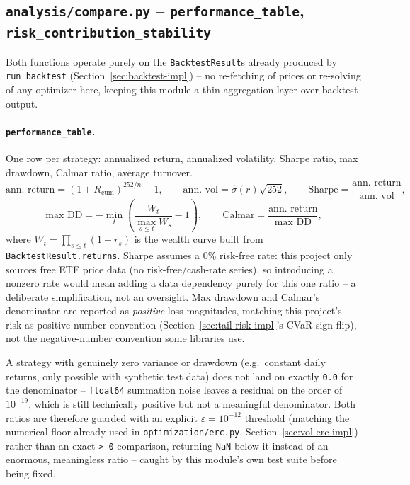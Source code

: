 \documentclass[11pt]{article}
\begin{document}
\subsection{\texttt{analysis/compare.py} -- \texttt{performance\_table}, \texttt{risk\_contribution\_stability}}
\label{sec:compare-impl}

Both functions operate purely on the \texttt{BacktestResult}s already
produced by \texttt{run\_backtest} (Section~\ref{sec:backtest-impl}) --
no re-fetching of prices or re-solving of any optimizer here, keeping
this module a thin aggregation layer over backtest output.

\paragraph{\texttt{performance\_table}.} One row per strategy:
annualized return, annualized volatility, Sharpe ratio, max drawdown,
Calmar ratio, average turnover.
\[
\text{ann. return} = (1+R_{\text{cum}})^{252/n} - 1, \qquad
\text{ann. vol} = \hat\sigma(r) \sqrt{252}, \qquad
\text{Sharpe} = \frac{\text{ann. return}}{\text{ann. vol}},
\]
\[
\text{max DD} = -\min_t\left(\frac{W_t}{\max_{s \leq t} W_s} - 1\right), \qquad
\text{Calmar} = \frac{\text{ann. return}}{\text{max DD}},
\]
where $W_t = \prod_{s \leq t}(1+r_s)$ is the wealth curve built from
\texttt{BacktestResult.returns}. Sharpe assumes a 0\% risk-free rate:
this project only sources free ETF price data (no risk-free/cash-rate
series), so introducing a nonzero rate would mean adding a data
dependency purely for this one ratio -- a deliberate simplification,
not an oversight. Max drawdown and Calmar's denominator are reported as
\emph{positive} loss magnitudes, matching this project's
risk-as-positive-number convention (Section~\ref{sec:tail-risk-impl}'s
CVaR sign flip), not the negative-number convention some libraries use.

A strategy with genuinely zero variance or drawdown (e.g.\ constant
daily returns, only possible with synthetic test data) does not land on
exactly \texttt{0.0} for the denominator -- \texttt{float64} summation
noise leaves a residual on the order of $10^{-19}$, which is still
technically positive but not a meaningful denominator. Both ratios are
therefore guarded with an explicit $\varepsilon = 10^{-12}$ threshold
(matching the numerical floor already used in
\texttt{optimization/erc.py}, Section~\ref{sec:vol-erc-impl}) rather
than an exact \texttt{> 0} comparison, returning \texttt{NaN} below it
instead of an enormous, meaningless ratio -- caught by this module's own
test suite before being fixed.
\end{document}

